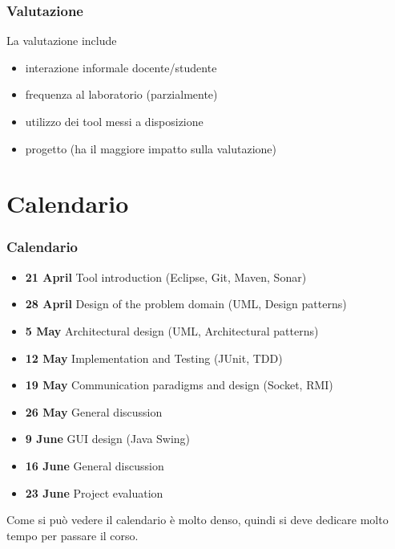 \documentclass{beamer}
\begin{document}
\begin{frame}
\frametitle{Valutazione}
La valutazione include
\begin{itemize}
\item interazione informale docente/studente
\item frequenza al laboratorio (parzialmente)
\item utilizzo dei tool messi a disposizione
\item progetto (ha il maggiore impatto sulla valutazione)
\end{itemize}
\end{frame}


\section{Calendario}
\begin{frame}
\frametitle{Calendario}
\begin{itemize}



\item  \textbf{21 April} Tool introduction (Eclipse, Git, Maven, Sonar)
\item  \textbf{28 April} Design of the problem domain (UML, Design patterns)
\item \textbf{5 May} Architectural design (UML, Architectural patterns)
\item \textbf{12 May} Implementation and Testing (JUnit, TDD)
\item \textbf{19 May} Communication paradigms and design (Socket, RMI) 
\item \textbf{26 May} General discussion
\item \textbf{9 June} GUI design (Java Swing)
\item \textbf{16 June} General discussion
\item \textbf{23 June} Project evaluation

\end{itemize}
Come si pu\`o vedere il calendario \`e molto denso, quindi si deve dedicare molto tempo per passare il corso.
\end{frame}


\end{document}
